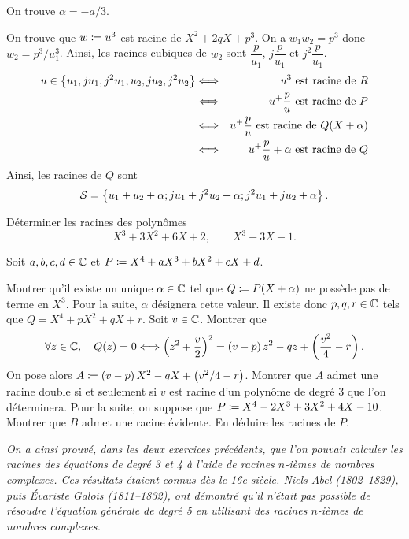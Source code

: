 \documentclass{magnolia}
\begin{document}
\begin{sol}
\begin{questions}
\question On trouve $\alpha=-a/3$.
\question 
\begin{questions}
\question On trouve que $w\coloneqq u^3$ est racine de $X^2+2qX+p^3$.
\question On a $w_1w_2=p^3$ donc $w_2=p^3/u_1^3$. Ainsi, les racines cubiques de $w_2$ sont $\dfrac{p}{u_1}$, $j\dfrac{p}{u_1}$ et $j^2\dfrac{p}{u_1}$. 
\question 
\begin{eqnarray*}
u\in\left\{u_1,ju_1,j^2u_1,u_2,ju_2,j^2u_2\right\} &\Longleftrightarrow& u^3 \text{ est racine de } R \\
&\Longleftrightarrow& u^+\dfrac{p}{u} \text{ est racine de } P\\
&\Longleftrightarrow& u^+\dfrac{p}{u} \text{ est racine de } Q(X+\alpha)\\
&\Longleftrightarrow& u^+\dfrac{p}{u}+\alpha \text{ est racine de } Q
\end{eqnarray*}
Ainsi, les racines de $Q$ sont $$\mathcal{S}=\left\{u_1+u_2+\alpha; ju_1+j^2u_2+\alpha; j^2u_1+ju_2+\alpha\right\}.$$
\end{questions} 
\question Déterminer les racines des polynômes
  \[X^3+3X^2+6X+2,\qquad X^3-3X-1.\]
\end{questions}
\end{sol}

Soit $a,b,c,d\in\mathbb{C}$ et $P\coloneqq X^4+aX^3+bX^2+cX+d$. 
\begin{questions}
\question Montrer qu'il existe un unique $\alpha\in\mathbb{C}$ tel que $Q\coloneqq P(X+\alpha)$ ne possède pas de terme en $X^3$.
\enonce Pour la suite, $\alpha$ désignera cette valeur. Il existe donc $p,q,r\in\mathbb{C}$ tels que $Q=X^4+p X^2+q X+ r$.
\question Soit $v\in\mathbb{C}$. Montrer que
  \[\forall z\in\mathbb{C},\quad Q(z)=0 \Longleftrightarrow \left(z^2+\frac{v}{2}\right)^2=\left(v-p\right)z^2-qz+\left(\frac{v^2}{4}-r\right).\]
  On pose alors $A\coloneqq \left(v-p\right)X^2-qX+\left(v^2/4-r\right)$.
\question Montrer que $A$ admet une racine double si et seulement si $v$ est racine d'un polynôme de degré 3 que l'on déterminera.
\enonce Pour la suite, on suppose que $P\coloneqq X^4-2X^3+3X^2+4X-10$.
\question Montrer que $B$ admet une racine évidente. En déduire les racines de $P$.
\end{questions}

\textit{On a ainsi prouvé, dans les deux exercices précédents, que l'on pouvait calculer les racines des équations de degré 3 et 4 à l'aide de racines $n$-ièmes de nombres complexes. Ces résultats étaient connus dès le 16e siècle. {\sc Niels Abel} (1802--1829), puis {\sc Évariste Galois} (1811--1832), ont démontré qu'il n'était pas possible de résoudre l'équation générale de degré 5 en utilisant des racines $n$-ièmes de nombres complexes.}
\end{document}
